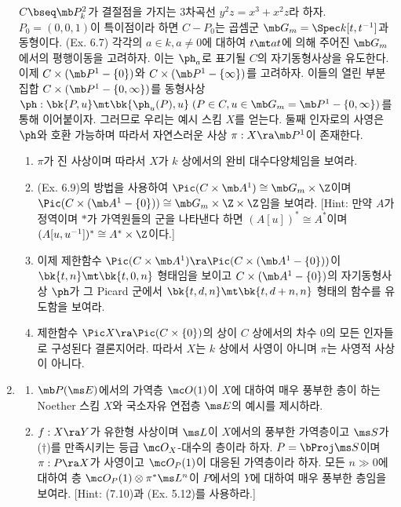 \begin{enumerate}[label=\tb{7.\arabic*.},itemindent=0mm,itemsep=2mm]
{	$C\bseq\mb P_k^2$가 결절점을 가지는 3차곡선 $y^2z=x^3+x^2z$라 하자.
	$P_0=(0,0,1)$이 특이점이라 하면 $C-P_0$는 곱셈군 $\mb G_m=\Spec k[t,t^{-1}]$과 동형이다. (Ex. 6.7)
	각각의 $a\in k,a\ne 0$에 대하여 $t\mt at$에 의해 주어진 $\mb G_m$에서의 평행이동을 고려하자.
	이는 $\ph_a$로 표기될 $C$의 자기동형사상을 유도한다.\\
	이제 $C\times(\mb P^1-\{0\})$와 $C\times(\mb P^1-\{\infty\})$를 고려하자.
	이들의 열린 부분집합 $C\times(\mb P^1-\{0,\infty\})$를 동형사상 $\ph:\bk{P,u}\mt\bk{\ph_u(P),u}\;
	(P\in C,u\in\mb G_m=\mb P^1-\{0,\infty\})$를 통해 이어붙이자.
	그러므로 우리는 예시 스킴 $X$를 얻는다. 둘째 인자로의 사영은 $\ph$와 호환 가능하며 따라서 자연스러운 사상 $\pi:X\ra\mb P^1$이 존재한다.
	\begin{enumerate}[label=(\alph*)]
	\item $\pi$가 진 사상이며 따라서 $X$가 $k$ 상에서의 완비 대수다양체임을 보여라.
	\item (Ex. 6.9)의 방법을 사용하여 $\Pic(C\times\mb A^1)\cong\mb G_m\times\Z$이며
	$\Pic(C\times(\mb A^1-\{0\}))\cong\mb G_m\times\Z\times\Z$임을 보여라.
	[Hint: 만약 $A$가 정역이며 $*$가 가역원들의 군을 나타낸다 하면 $(A[u])^*\cong A^*$이며 $(A[u,u^{-1}])^*\cong A^*\times\Z$이다.]
	\item 이제 제한함수 $\Pic(C\times\mb A^1)\ra\Pic(C\times(\mb A^1-\{0\}))$이 $\bk{t,n}\mt\bk{t,0,n}$ 형태임을 보이고
	$C\times(\mb A^1-\{0\})$의 자기동형사상 $\ph$가 그 Picard 군에서 $\bk{t,d,n}\mt\bk{t,d+n,n}$ 형태의 함수를 유도함을 보여라.
	\item 제한함수 $\Pic X\ra\Pic(C\times\{0\})$의 상이 $C$ 상에서의 차수 0의 모든 인자들로 구성된다 결론지어라.
	따라서 $X$는 $k$ 상에서 사영이 아니며 $\pi$는 사영적 사상이 아니다.
	\end{enumerate}}
	\item \begin{enumerate}[label=(\alph*)]
	\item $\mb P(\ms E)$에서의 가역층 $\mc O(1)$이 $X$에 대하여 매우 풍부한 층이  하는
	Noether 스킴 $X$와 국소자유 연접층 $\ms E$의 예시를 제시하라.
	\item $f:X\ra Y$가 유한형 사상이며 $\ms L$이 $X$에서의 풍부한 가역층이고
	$\ms S$가 ($\dag$)를 만족시키는 등급 $\mc O_X$-대수의 층이라 하자.
	$P=\bProj\ms S$이며 $\pi:P\ra X$가 사영이고 $\mc O_P(1)$이 대응된 가역층이라 하자.
	모든 $n\gg 0$에 대하여 층 $\mc O_P(1)\otimes\pi^*\ms L^n$이 $P$에서의 $Y$에 대하여 매우 풍부한 층임을 보여라.
	[Hint: (7.10)과 (Ex. 5.12)를 사용하라.]
	\end{enumerate}
	\end{enumerate}
	
